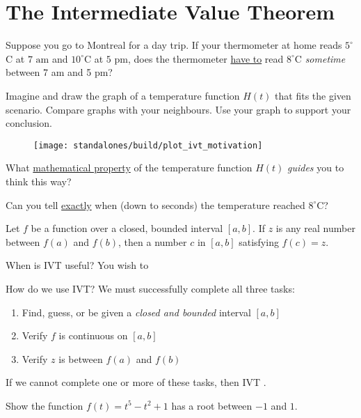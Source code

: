 \documentclass[../main.tex]{subfiles}
\begin{document}
 \section{The Intermediate Value Theorem}
  \faComments{} Suppose you go to Montreal for a day trip. If your thermometer at home reads \(5^{\circ}\)C at \(7 \text{ am}\) and \({10}^{\circ}\)C at \(5\text{ pm}\), does the thermometer \underline{have to} read \({8}^{\circ}\)C \emph{sometime} between 7 am and 5 pm?


  Imagine and draw the graph of a temperature function \(H(t)\) that fits the given scenario. Compare graphs with your neighbours. Use your graph to support your conclusion.

  \begin{figure}[!h]  %
    \centering
    \texttt{[image: standalones/build/plot\_ivt\_motivation]}
    \label{fig:label}
  \end{figure}

  What \underline{mathematical property} of the temperature function \(H(t)\) \emph{guides} you to think this way?

  Can you tell \underline{exactly} when (down to seconds) the temperature reached \(8^{\circ}\)C?

  \begin{mdframed}[style=withref]
    Let \(f\) be a \underline{\hspace{1in}} function over a closed, bounded interval \([a,b]\). If \(z\) is any real number between \(f(a)\) and \(f(b)\), then \underline{\hspace{1in}} a number \(c\) in \([a,b]\) satisfying \(f(c) = z\).

  \end{mdframed}

  When is IVT useful? You wish to 
  \large{}

  How do we use IVT? We must successfully complete all three tasks: 
  \begin{enumerate}[label=(IVT \arabic*)]
    \item Find, guess, or be given {a \emph{closed and bounded} interval \([a,b]\)}
    \item Verify {\(f\) is continuous on \([a,b]\)}
    \item Verify {\(z\) is between \(f(a)\) and \(f(b)\)}
  \end{enumerate}
  If we cannot complete one or more of these tasks, then IVT .

  \begin{example}
    Show the function \(f(t) = t^{5} - t^{2} + 1\) has a root between \(-1\) and \(1\).
  \end{example}
\end{document}
